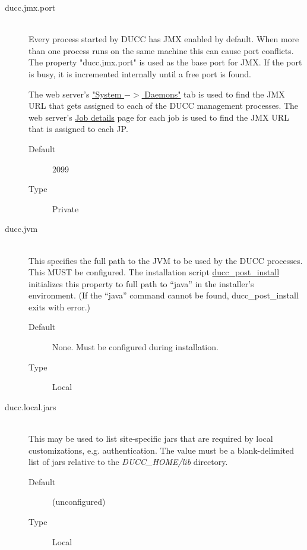 \begin{description}
       \item[ducc.jmx.port] \hfill \\
         Every process started by DUCC has JMX enabled by default. When more than one process 
         runs on the same machine this can cause port conflicts. The property "ducc.jmx.port" is 
         used as the base port for JMX. If the port is busy, it is incremented internally until a free 
         port is found. 
         
         The web server's \hyperref[sec:system-details.daemons]{"System $->$ Daemons"} tab is used
         to find the JMX URL that gets assigned to each of the DUCC management processes. The web
         server's \hyperref[sec:ws-job-details]{Job details} page for each job is used to find the
         JMX URL that is assigned to each JP.
         
         \begin{description}
           \item[Default] 2099 
           \item[Type] Private 
         \end{description}

       \item[ducc.jvm] \hfill \\
         This specifies the full path to the JVM to be used by the DUCC processes. This MUST be
         configured.  The installation script
         \hyperref[subsec:install.single-user]{ducc\_post\_install} initializes this property to 
         full path to ``java'' in the installer's environment.  (If the ``java'' command cannot
         be found, ducc\_post\_install exits with error.)
         \begin{description}
           \item[Default] None.  Must be configured during installation.
           \item[Type] Local 
         \end{description}

       \item[ducc.local.jars] \hfill \\
         This may be used to list site-specific jars that are required by local
         customizations, e.g. authentication.  The value must be a blank-delimited list of jars
         relative to the {\em DUCC\_HOME/lib} directory.
         \begin{description}
           \item[Default] (unconfigured) 
           \item[Type] Local
         \end{description}


\end{description}
